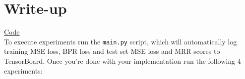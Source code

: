 \documentclass[12pt]{article}
\begin{document}



\section{Write-up}
\href{https://github.com/seokjeongeum/cs330/tree/master/hw0_starter_code}{Code}\\
To execute experiments run the \texttt{main.py} script, which will automatically log training MSE loss, BPR loss and test set MSE loss and MRR scores to TensorBoard. Once you're done with your implementation run the following 4 experiments:
\end{document}
